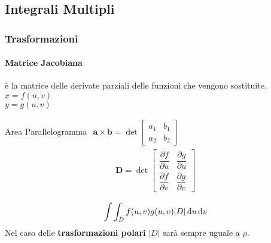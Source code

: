 \subsection{Integrali Multipli}
\subsubsection{Trasformazioni}
\paragraph{Matrice Jacobiana} è la matrice delle derivate parziali delle funzioni che vengono sostituite.\\
$x = f(u,v)$\\
$y = g(u,v)$

Area Parallelogramma
\begin{math}
\displaystyle {
\begin{aligned}\mathbf {a} \times \mathbf {b} = \det{
	\begin{bmatrix}
		a_{1} & b_{1}\\
		a_{2} & b_{2}
	\end{bmatrix}
	}
\end{aligned}
}
\end{math}\\

\begin{align}\mathbf {D} = \det{
	\begin{bmatrix}
		\dfrac{\partial f}{\partial u} & \dfrac{\partial g}{\partial u}\\[1em]
		\dfrac{\partial f}{\partial v} & \dfrac{\partial g}{\partial v}
	\end{bmatrix}
	}
	\tag{determinante matrice Jacobiana}
\end{align}


\begin{equation}
	\int\int_{D} f(u,v) g(u,v)|D|\,\mathrm{d} u \,\mathrm{d} v
\end{equation}
Nel caso delle \textbf{trasformazioni polari} $|D|$ sarà sempre uguale a $\rho$.

